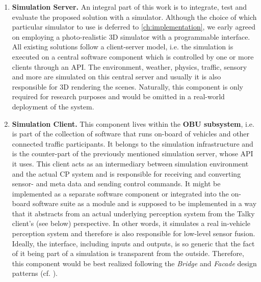 \begin{enumerate}[C1: ]
	\item \textbf{Simulation Server.} An integral part of this work is to integrate, test and evaluate the proposed solution with a simulator. Although the choice of which particular simulator to use is deferred to \cref{ch:implementation}, we early agreed on employing a photo-realistic 3D simulator with a programmable interface. All existing solutions follow a client-server model, i.e. the simulation is executed on a central software component which is controlled by one or more clients through an API. The environment, weather, physics, traffic, sensory and more are simulated on this central server and usually it is also responsible for 3D rendering the scenes. Naturally, this component is only required for research purposes and would be omitted in a real-world deployment of the system.
	\item \textbf{Simulation Client.} This component lives within the \textbf{OBU subsystem}, i.e. is part of the collection of software that runs on-board of vehicles and other connected traffic participants. It belongs to the simulation infrastructure and is the counter-part of the previously mentioned simulation server, whose API it uses. This client acts as an intermediary between simulation environment and the actual CP system and is responsible for receiving and converting sensor- and meta data and sending control commands. It might be implemented as a separate software component or integrated into the on-board software suite as a module and is supposed to be implemented in a way that it abstracts from an actual underlying perception system from the Talky client's (see below) perspective. In other words, it simulates a real in-vehicle perception system and therefore is also responsible for low-level sensor fusion. Ideally, the interface, including inputs and outputs, is so generic that the fact of it being part of a simulation is transparent from the outside. Therefore, this component would be best realized following the \textit{Bridge} and \textit{Facade} design patterns (cf. \cite{EricFreemanElisabethFreemanBertBates2013}).

\end{enumerate}
